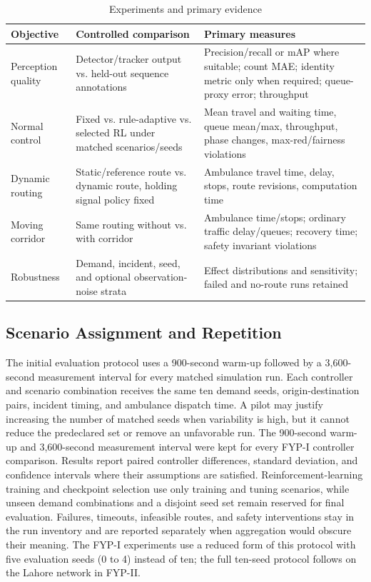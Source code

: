 \begin{table}[htbp]
\centering
\caption{Experiments and primary evidence}
\label{tab:experiments}
\begin{tabularx}{\textwidth}{p{}p{}Y}
\toprule
\textbf{Objective} & \textbf{Controlled comparison} & \textbf{Primary measures}\\
\midrule
Perception quality & Detector/tracker output vs. held-out sequence annotations & Precision/recall or mAP where suitable; count MAE; identity metric only when required; queue-proxy error; throughput\\
Normal control & Fixed vs. rule-adaptive vs. selected RL under matched scenarios/seeds & Mean travel and waiting time, queue mean/max, throughput, phase changes, max-red/fairness violations\\
Dynamic routing & Static/reference route vs. dynamic route, holding signal policy fixed & Ambulance travel time, delay, stops, route revisions, computation time\\
Moving corridor & Same routing without vs. with corridor & Ambulance time/stops; ordinary traffic delay/queues; recovery time; safety invariant violations\\
Robustness & Demand, incident, seed, and optional observation-noise strata & Effect distributions and sensitivity; failed and no-route runs retained\\
\bottomrule
\end{tabularx}
\end{table}

\subsection{Scenario Assignment and Repetition}

The initial evaluation protocol uses a 900-second warm-up followed by a 3,600-second measurement interval for every matched simulation run. Each controller and scenario combination receives the same ten demand seeds, origin-destination pairs, incident timing, and ambulance dispatch time. A pilot may justify increasing the number of matched seeds when variability is high, but it cannot reduce the predeclared set or remove an unfavorable run. The 900-second warm-up and 3,600-second measurement interval were kept for every FYP-I controller comparison. Results report paired controller differences, standard deviation, and confidence intervals where their assumptions are satisfied. Reinforcement-learning training and checkpoint selection use only training and tuning scenarios, while unseen demand combinations and a disjoint seed set remain reserved for final evaluation. Failures, timeouts, infeasible routes, and safety interventions stay in the run inventory and are reported separately when aggregation would obscure their meaning. The FYP-I experiments use a reduced form of this protocol with five evaluation seeds (0 to 4) instead of ten; the full ten-seed protocol follows on the Lahore network in FYP-II.

